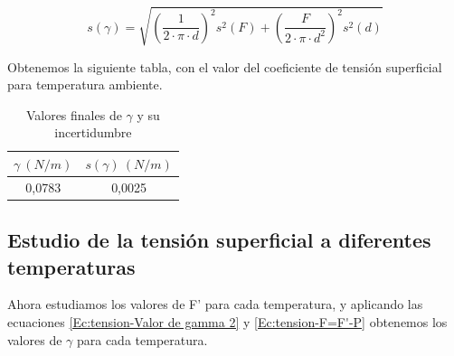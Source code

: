 \documentclass[12pt,a4paper]{book}
\begin{document}
\begin{equation}
s(\gamma)=\sqrt{(\dfrac{1}{2\cdot \pi \cdot d})^2s^2(F)+(\dfrac{F}{2 \cdot \pi \cdot d^2})^2s^2(d)}
\label{Ec:tension valor del coeficiente de tensión superficial incertidumbre}
\end{equation}

\vspace*{0.15cm}

Obtenemos la siguiente tabla, con el valor del coeficiente de tensión superficial para temperatura ambiente. 

\begin{table}[h!] %
\begin{center}
\begin{tabular}{|c|c|}
\hline
$\gamma  \ (N/m)$ &  $s(\gamma) \ (N/m)$ \\ \hline
0,0783 & 0,0025 \\ \hline
\end{tabular}
\caption{Valores finales de $\gamma$ y su incertidumbre}
\label{tab:valores finales F a temperatura ambiente}
\end{center}
\end{table}

\newpage

\subsection{Estudio de la tensión superficial a diferentes temperaturas}
Ahora estudiamos los valores de F' para cada temperatura, y aplicando las ecuaciones \ref{Ec:tension-Valor de gamma 2} y \ref{Ec:tension-F=F'-P} obtenemos los valores de $\gamma$ para cada temperatura.
\end{document}
